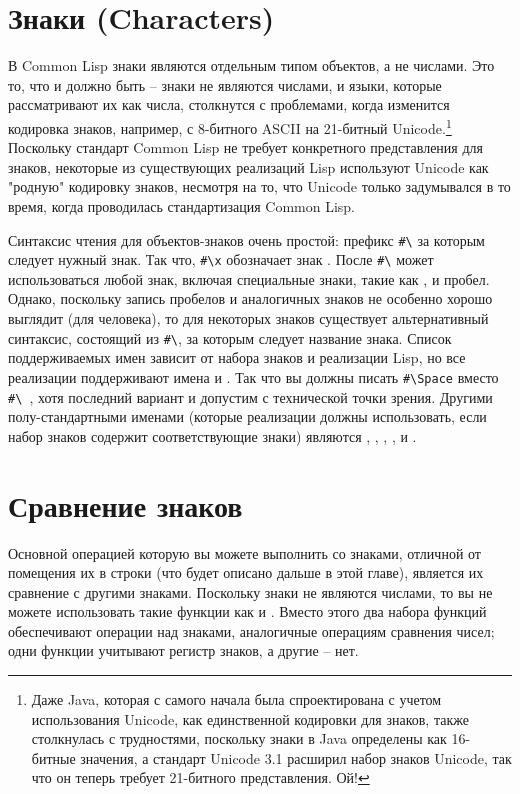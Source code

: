\section{Знаки (Characters)}

В Common Lisp знаки являются отдельным типом объектов, а не числами.  Это то, что и должно
быть -- знаки не являются числами, и языки, которые рассматривают их как числа, столкнутся
с проблемами, когда изменится кодировка знаков, например, с 8-битного ASCII на 21-битный
Unicode.\footnote{Даже Java, которая с самого начала была спроектирована с учетом
  использования Unicode, как единственной кодировки для знаков, также столкнулась с
  трудностями, поскольку знаки в Java определены как 16-битные значения, а стандарт
  Unicode 3.1 расширил набор знаков Unicode, так что он теперь требует 21-битного
  представления.  Ой!}  Поскольку стандарт Common Lisp не требует конкретного
представления для знаков, некоторые из существующих реализаций Lisp используют Unicode как
"родную" кодировку знаков, несмотря на то, что Unicode только задумывался в то время,
когда проводилась стандартизация Common Lisp.

Синтаксис чтения для объектов-знаков очень простой: префикс \lstinline!#\! за которым
следует нужный знак.  Так что, \lstinline!#\x! обозначает знак .  После
\lstinline!#\! может использоваться любой знак, включая специальные знаки, такие как
, \code{(} и пробел.  Однако, поскольку запись пробелов и аналогичных знаков не
особенно хорошо выглядит (для человека), то для некоторых знаков существует альтернативный
синтаксис, состоящий из \lstinline!#\!, за которым следует название знака.  Список
поддерживаемых имен зависит от набора знаков и реализации Lisp, но все реализации
поддерживают имена  и .  Так что вы должны писать
\lstinline!#\Space! вместо \lstinline!#\ !, хотя последний вариант и допустим с
технической точки зрения.  Другими полу-стандартными именами (которые реализации должны
использовать, если набор знаков содержит соответствующие знаки) являются ,
, , ,  и .

\section{Сравнение знаков}

Основной операцией которую вы можете выполнить со знаками, отличной от помещения их в
строки (что будет описано дальше в этой главе), является их сравнение с другими знаками.
Поскольку знаки не являются числами, то вы не можете использовать такие функции как
\code{<} и \code{>}.  Вместо этого два набора функций обеспечивают операции над знаками,
аналогичные операциям сравнения чисел; одни функции учитывают регистр знаков, а другие --
нет.

